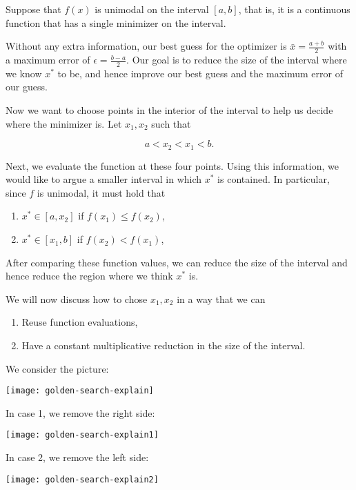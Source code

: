 \documentclass[../open-optimization/open-optimization.tex]{subfiles}
\begin{document}
Suppose that $f(x)$ is unimodal on the interval $[a,b]$, that is, it is a continuous function that has a single minimizer on the interval.  

Without any extra information, our best guess for the optimizer is $\bar x = \tfrac{a+ b}{2}$ with a maximum error of $\epsilon = \tfrac{b-a}{2}$.    Our goal is to reduce the size of the interval where we know $x^*$ to be, and hence improve our best guess and the maximum error of our guess.


 Now we want to choose points in the interior of the interval to help us decide where the minimizer is.  Let $x_1, x_2$ such that 

$$
a < x_2 < x_1 < b.
$$

Next, we evaluate the function at these four points.  Using this information, we would like to argue a smaller interval in which $x^*$ is contained.  In particular, since $f$ is unimodal, it must hold that 
\begin{enumerate}
\item $x^* \in [a, x_2]$ if  $f(x_1) \leq f(x_2)$, 
\item $x^* \in [x_1,b]$ if $f(x_2) < f(x_1)$,
\end{enumerate}


After comparing these function values, we can reduce the size of the interval and hence reduce the region where we think $x^*$ is.   


We will now discuss how to chose $x_1,x_2$ in a way that we can 
\begin{enumerate}
\item Reuse function evaluations,
\item Have a constant multiplicative reduction in the size of the interval.
\end{enumerate}


We consider the picture:\\
\begin{center}
\texttt{[image: golden-search-explain]}\\
\end{center}
In case 1, we remove the right side:\\
\begin{center}
\texttt{[image: golden-search-explain1]}\\
\end{center}
In case 2, we remove the left side:\\
\begin{center}
\texttt{[image: golden-search-explain2]}\\
\end{center}
\end{document}
